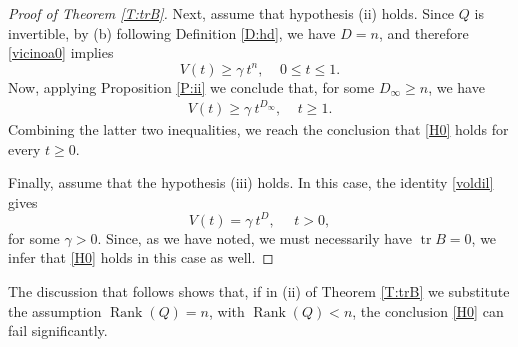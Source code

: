 \documentclass[11pt,letter]{amsart}
\numberwithin{equation}{section}
\newcommand{\tr}{\operatorname{tr}}
\numberwithin{equation}{section}
\begin{document}
\begin{proof}[Proof of Theorem \ref{T:trB}]
Next, assume that hypothesis (ii) holds. Since $Q$ is invertible, by (b) following Definition \ref{D:hd}, we have $D = n$, and therefore \eqref{vicinoa0} implies
\[
V(t)\ge \gamma\ t^{n},\ \ \ \ \ 0\le t\le 1.
\]
Now, applying Proposition \ref{P:ii} we conclude that, for some $D_\infty \ge n$, we have
\begin{align*}
V(t)\ge \gamma\ t^{D_{\infty}},\ \ \ \ \ t\ge 1.
\end{align*} 
Combining the latter two inequalities, we reach the conclusion that \eqref{H0} holds for every $t\ge 0$.

Finally, assume that the hypothesis (iii) holds. In this case, the identity \eqref{voldil} gives
\[
V(t) = \gamma\ t^D,\ \ \ \ \ \ t>0,
\]
for some $\gamma >0$. Since, as we have noted, we must necessarily have $\tr B = 0$, we infer that \eqref{H0} holds in this case as well.

\end{proof}

The discussion that follows shows that, if in (ii) of Theorem \ref{T:trB} we substitute the assumption $\operatorname{Rank}(Q) = n$, with $\operatorname{Rank}(Q) < n$, the conclusion \eqref{H0} can fail significantly.

\medskip
\end{document}
